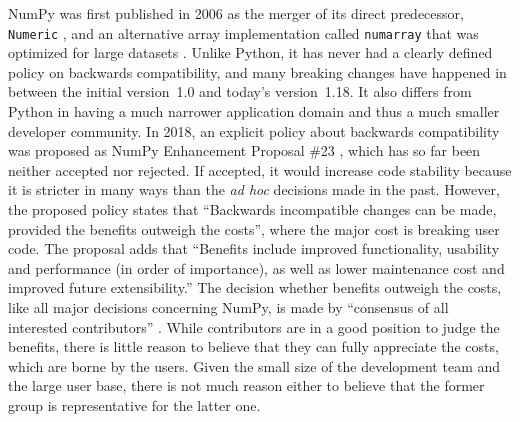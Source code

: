 \vspace{1mm}

NumPy was first published in 2006 as the merger of its direct predecessor, \texttt{Numeric} \cite{DuboisNumericalPython1996}, and an alternative array implementation called \texttt{numarray} that was optimized for large datasets \cite{GreenfieldnumarrayNewScientific2003}. Unlike Python, it has never had a clearly defined policy on backwards compatibility, and many breaking changes have happened in between the initial version~1.0 and today's version~1.18. It also differs from Python in having a much narrower application domain and thus a much smaller developer community. In 2018, an explicit policy about backwards compatibility was proposed as NumPy Enhancement Proposal \#23 \cite{GommersNEP23Backwards2018},
which has so far been neither accepted nor rejected. If accepted, it would increase code stability because it is stricter in many ways than the \textit{ad hoc} decisions made in the past. However, the proposed policy states that ``Backwards incompatible changes can be made, provided the benefits outweigh the costs'', where the major cost is breaking user code. The proposal adds that ``Benefits include improved functionality, usability and performance (in order of importance), as well as lower maintenance cost and improved future extensibility.'' The decision whether benefits outweigh the costs, like all major decisions concerning NumPy, is made by ``consensus of all interested contributors'' \cite{NumPydevelopersNumPyprojectgovernance2020}.
While contributors are in a good position to judge the benefits, there is little reason to believe that they can fully appreciate the costs, which are borne by the users. Given the small size of the development team and the large user base, there is not much reason either to believe that the former group is representative for the latter one.


